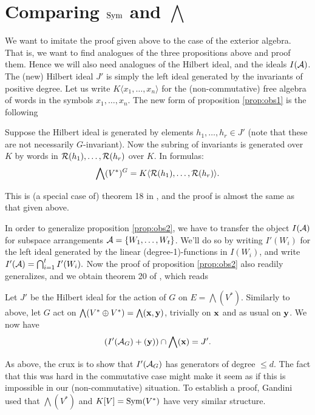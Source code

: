 \documentclass[../main.tex]{subfiles}
\begin{document}
\section{Comparing $\operatorname{Sym}$ and $\bigwedge$}
We want to imitate the proof given above to the case of the exterior algebra. 
That is, we want to find analogues of the three propositions above and
proof them. Hence we will also need analogues of the Hilbert ideal, and the 
ideals $I(\mathcal{A})$.
The (new) Hilbert ideal $J'$ is simply the left ideal generated by the
invariants of positive degree.
Let us write $K\langle x_1, \dots, x_n \rangle$ for the (non-commutative) free
algebra of words in the symbols $x_1, \dots, x_n$. 
The new form of proposition \ref{prop:obs1} is the following
\begin{prop}\label{prop:newobs1}
    Suppose the Hilbert ideal is generated by elements $h_1, \dots, h_r \in J'$ 
    (note that these are not necessarily $G$-invariant). Now the subring of invariants
    is generated over $K$ by words in $\mathcal{R}(h_1), \dots, \mathcal{R}(h_r)$ over $K$. In formulas:
    \begin{equation*}
        \bigwedge(V^*)^G = K\langle\mathcal{R}(h_1), \dots, \mathcal{R}(h_r)\rangle.
    \end{equation*}
\end{prop}
This is (a special case of) theorem 18 in \cite{gandini2021degree}, and the proof
is almost the same as that given above.

In order to generalize proposition \ref{prop:obs2}, we have to transfer 
the object $I(\mathcal{A})$ for subspace arrangements $\mathcal{A} = \{W_1, \dots, W_t\}$. We'll 
do so by writing $I'(W_i)$ for the left ideal generated by the linear
(degree-1)-functions in $I(W_i)$, and write $I'(\mathcal{A}) = \bigcap_{i = 1}^t
I'(W_i).$ Now the proof of proposition \ref{prop:obs2} also readily
generalizes, and we obtain theorem 20 of \cite{gandini2021degree}, which reads
\begin{prop}
    Let $J'$ be the Hilbert ideal for the action of $G$ on $E = \bigwedge(V^*)$.
    Similarly to above, let $G$ act on $\bigwedge(V^* \oplus V^*) =
    \bigwedge(\mathbf{x}, \mathbf{y})$, trivially on $\mathbf{x}$ and as usual on $\mathbf{y}$. We now have
    \begin{equation*}
        (I'(\mathcal{A}_G) + (\mathbf{y})) \cap \bigwedge(\mathbf{x}) = J'.
    \end{equation*}
\end{prop}

As above, the crux is to show that $I'(\mathcal{A}_G)$ has generators of degree $\leq
d$. The fact that this was hard in the commutative case might make it seem as
if this is impossible in our (non-commutative) situation. To establish 
a proof, Gandini used that 
$\bigwedge(V^*)$ and $K[V] = \operatorname{Sym}(V^*)$ have very similar structure. 
\end{document}
